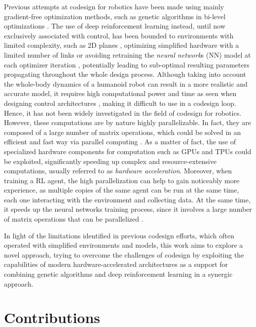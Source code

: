 Previous attempts at codesign for robotics have been made using mainly gradient-free optimization methods, such as genetic algorithms in bi-level optimizations \citep{sartore_optimization_2022,fadini_simulation_2022}. The use of deep reinforcement learning instead, until now exclusively associated with control, has been bounded to environments with limited complexity, such as 2D planes \citep{ha_reinforcement_2019}, optimizing simplified hardware with a limited number of links \citep{chen_hardware_2020} or avoiding retraining the \textit{neural network}s (NN) model at each optimizer iteration \citep{bjelonic_learning-based_2023}, potentially leading to sub-optimal resulting parameters propagating throughout the whole design process. Although taking into account the whole-body dynamics of a humanoid robot can result in a more realistic and accurate model, it requires high computational power and time as seen when designing control architectures \citep{ramuzat_benchmarking_2022}, making it difficult to use in a codesign loop. Hence, it has not been widely investigated in the field of codesign for robotics. However, these computations are by nature highly parallelizable. In fact, they are composed of a large number of matrix operations, which could be solved in an efficient and fast way via parallel computing \citep{gyawali_comparative_2023, tuma_2023}. As a matter of fact, the use of specialized hardware components for computation such as \ac{GPU}s and \ac{TPU}s could be exploited, significantly speeding up complex and resource-extensive computations, usually referred to as \textit{hardware acceleration}. Moreover, when training a \ac{RL} agent, the high parallelization can help to gain noticeably more experience, as multiple copies of the same agent can be run at the same time, each one interacting with the environment and collecting data. At the same time, it speeds up the neural networks training process, since it involves a large number of matrix operations that can be parallelized \citep{pandey_transformational_2022,gyawali_comparative_2023}.

In light of the limitations identified in previous codesign efforts, which often operated with simplified environments and models, this work aims to explore a novel approach, trying to overcome the challenges of codesign by exploiting the capabilities of modern hardware-accelerated architectures as a support for combining genetic algorithms and deep reinforcement learning in a synergic approach.

\section*{Contributions}

